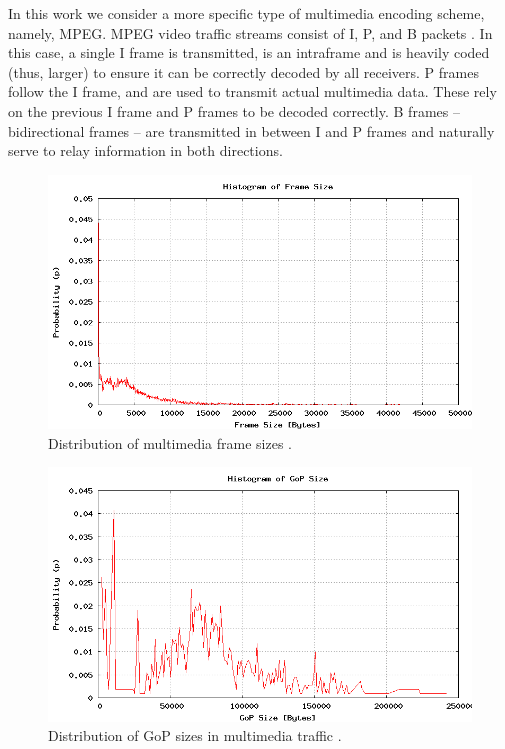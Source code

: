 \documentclass{llncs}
\begin{document}
In this work we consider a more specific type of multimedia encoding scheme, namely, MPEG. MPEG video traffic streams consist of I, P, and B packets \cite{sony-demo}. In this case, a single I frame is transmitted, is an intraframe and is heavily coded (thus, larger) to ensure it can be correctly decoded by all receivers. P frames follow the I frame, and are used to transmit actual multimedia data. These rely on the previous I frame and P frames to be decoded correctly. B frames -- bidirectional frames -- are transmitted in between I and P frames and naturally serve to relay information in both directions. 

\begin{figure}
\begin{center}
\includegraphics[scale=0.35]{frame.png}
\caption{Distribution of multimedia frame sizes \cite{sony-demo}.}
\label{fig:frame}
\end{center}
\end{figure}

\begin{figure}
\begin{center}
\includegraphics[scale=0.35]{gop.png}
\caption{Distribution of GoP sizes in multimedia traffic \cite{sony-demo}.}
\label{fig:gop}
\end{center}
\end{figure}
\end{document}
